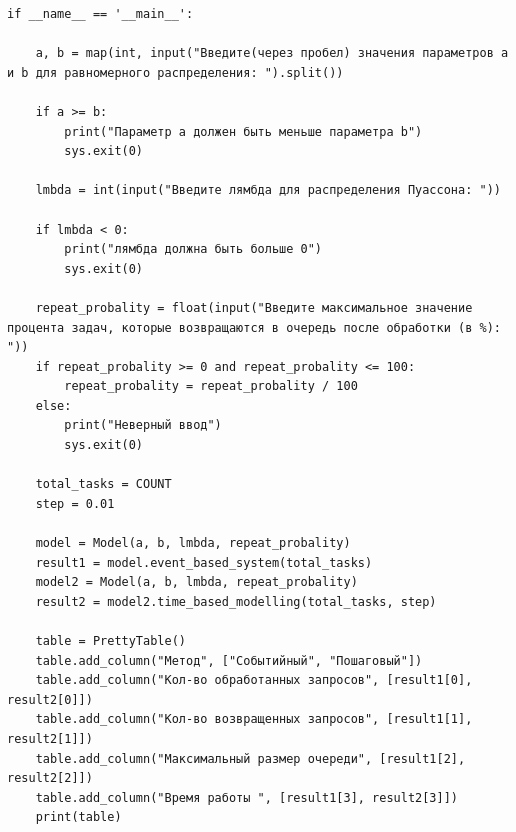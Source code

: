 \documentclass[14pt, a4paper]{extarticle}
\begin{document}
\begin{lstlisting}[label=lst:list1]
if __name__ == '__main__':

    a, b = map(int, input("Введите(через пробел) значения параметров a и b для равномерного распределения: ").split())

    if a >= b:
        print("Параметр a должен быть меньше параметра b")
        sys.exit(0)

    lmbda = int(input("Введите лямбда для распределения Пуассона: "))

    if lmbda < 0:
        print("лямбда должна быть больше 0")
        sys.exit(0)

    repeat_probality = float(input("Введите максимальное значение процента задач, которые возвращаются в очередь после обработки (в %): "))
    if repeat_probality >= 0 and repeat_probality <= 100:
        repeat_probality = repeat_probality / 100
    else:
        print("Неверный ввод")
        sys.exit(0)

    total_tasks = COUNT
    step = 0.01

    model = Model(a, b, lmbda, repeat_probality)
    result1 = model.event_based_system(total_tasks)
    model2 = Model(a, b, lmbda, repeat_probality)
    result2 = model2.time_based_modelling(total_tasks, step)

    table = PrettyTable()
    table.add_column("Метод", ["Событийный", "Пошаговый"])
    table.add_column("Кол-во обработанных запросов", [result1[0], result2[0]])
    table.add_column("Кол-во возвращенных запросов", [result1[1], result2[1]])
    table.add_column("Максимальный размер очереди", [result1[2], result2[2]])
    table.add_column("Время работы ", [result1[3], result2[3]])
    print(table)
\end{lstlisting}
\end{document}
